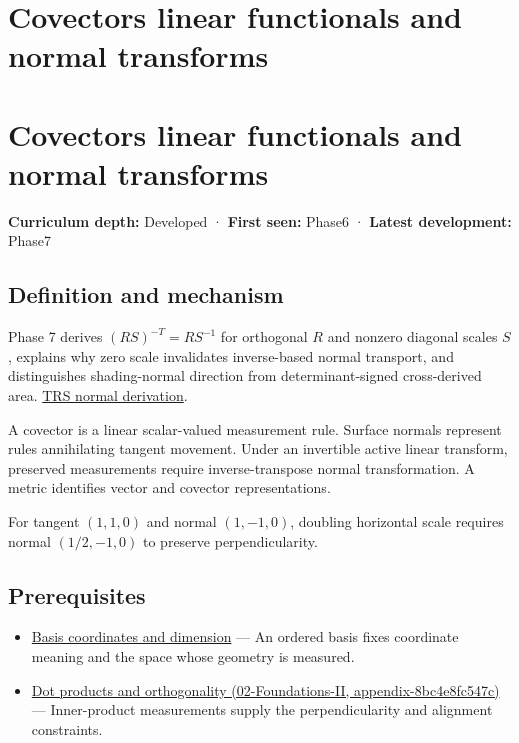 \hypertarget{appendix-46da295c6787}{}
\section*{Covectors linear functionals and normal transforms}
\section{Covectors linear functionals and normal transforms}\label{appendix-46da295c6787-covectors-linear-functionals-and-normal-transforms}

\textbf{Curriculum depth:} Developed · \textbf{First seen:} Phase6 · \textbf{Latest development:} Phase7

\subsection{Definition and mechanism}\label{appendix-46da295c6787-definition-and-mechanism}

Phase 7 derives \((RS)^{-T}=RS^{-1}\) for orthogonal \(R\) and nonzero diagonal scales \(S\), explains why zero scale invalidates inverse-based normal transport, and distinguishes shading-normal direction from determinant-signed cross-derived area. \hyperref[01-foundations-i-ch019-normals-undo-scale-before-following-rotation]{TRS normal derivation}.

A covector is a linear scalar-valued measurement rule. Surface normals represent rules annihilating tangent movement. Under an invertible active linear transform, preserved measurements require inverse-transpose normal transformation. A metric identifies vector and covector representations.

For tangent \((1,1,0)\) and normal \((1,-1,0)\), doubling horizontal scale requires normal \((1/2,-1,0)\) to preserve perpendicularity.

\subsection{Prerequisites}\label{appendix-46da295c6787-prerequisites}

\begin{itemize}
\tightlist
\item
  \hyperref[appendix-ce0341f7ea0d]{Basis coordinates and dimension} --- An ordered basis fixes coordinate meaning and the space whose geometry is measured.
\item
  \href{../02-Foundations-II/main.pdf\#nameddest=appendix-8bc4e8fc547c}{Dot products and orthogonality (02-Foundations-II, appendix-8bc4e8fc547c)} --- Inner-product measurements supply the perpendicularity and alignment constraints.
\end{itemize}


